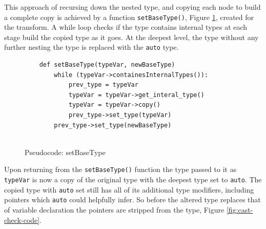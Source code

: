 \documentclass[bsc,frontabs,singlespacing,twoside,parskip,deptreport]{infthesis}
\begin{document}
This approach of recursing down the nested type, and copying each node to build a complete copy is achieved by a function \texttt{setBaseType()}, Figure \ref{fig:code-set-type}, created for the transform. A while loop checks if the type contains internal types at each stage build the copied type as it goes. At the deepest level, the type without any further nesting the type is replaced with the \texttt{auto} type. 


\begin{figure}[H]
    \begin{verbatim}
    def setBaseType(typeVar, newBaseType)
        while (typeVar->containesInternalTypes()):
            prev_type = typeVar
            typeVar = typeVar->get_interal_type()
            typeVar = typeVar->copy()
            prev_type->set_type(typeVar)
        prev_type->set_type(newBaseType)    
            
    \end{verbatim}
    \caption{Pseudocode: setBaseType}
    \centering
    \label{fig:code-set-type}
\end{figure}

Upon returning from the \texttt{setBaseType()} function the type passed to it as \texttt{typeVar} is now a copy of the original type with the deepest type set to \texttt{auto}. The copied type with \texttt{auto} set still has all of its additional type modifiers, including pointers which \texttt{auto} could helpfully infer. So before the altered type replaces that of variable declaration the pointers are stripped from the type, Figure \ref{fig:cast-check-code}. 





    
    
\end{document}
